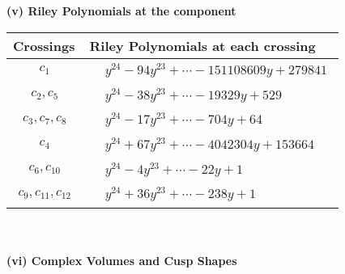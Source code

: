 \documentclass[1p]{elsarticle_modified}
\theoremstyle{definition}
\begin{document}
\newpage\renewcommand{\arraystretch}{1}
\flushleft \textbf{(v) Riley Polynomials at the component}\newline \\
\begin{tabular}{m{50pt}|m{274pt}}
Crossings & \hspace{64pt}Riley Polynomials at each crossing \\
\hline $$\begin{aligned}c_{1}\end{aligned}$$&$\begin{aligned}
&y^{24}-94 y^{23}+\cdots-151108609 y+279841
\end{aligned}$\\
\hline $$\begin{aligned}c_{2},c_{5}\end{aligned}$$&$\begin{aligned}
&y^{24}-38 y^{23}+\cdots-19329 y+529
\end{aligned}$\\
\hline $$\begin{aligned}c_{3},c_{7},c_{8}\end{aligned}$$&$\begin{aligned}
&y^{24}-17 y^{23}+\cdots-704 y+64
\end{aligned}$\\
\hline $$\begin{aligned}c_{4}\end{aligned}$$&$\begin{aligned}
&y^{24}+67 y^{23}+\cdots-4042304 y+153664
\end{aligned}$\\
\hline $$\begin{aligned}c_{6},c_{10}\end{aligned}$$&$\begin{aligned}
&y^{24}-4 y^{23}+\cdots-22 y+1
\end{aligned}$\\
\hline $$\begin{aligned}c_{9},c_{11},c_{12}\end{aligned}$$&$\begin{aligned}
&y^{24}+36 y^{23}+\cdots-238 y+1
\end{aligned}$\\
\hline
\end{tabular}\\~\\
\newpage\flushleft \textbf{(vi) Complex Volumes and Cusp Shapes}
\end{document}
